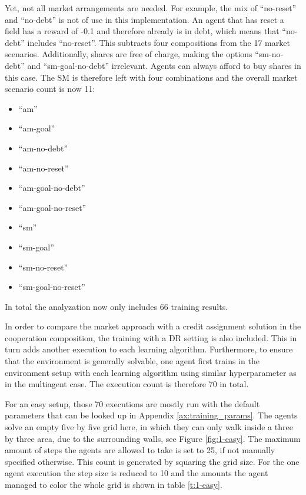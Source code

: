 Yet, not all market arrangements are needed. For example, the mix of ``no-reset'' and ``no-debt'' is not of use in this implementation. An agent that has reset a field has a reward of -0.1 and therefore already is in debt, which means that ``no-debt'' includes ``no-reset''. This subtracts four compositions from the 17 market scenarios. Additionally, shares are free of charge, making the options ``sm-no-debt'' and ``sm-goal-no-debt'' irrelevant. Agents can always afford to buy shares in this case. The SM is therefore left with four combinations and the overall market scenario count is now 11:
\begin{itemize}
    \item ``am''
    \item ``am-goal''
    \item ``am-no-debt''
    \item ``am-no-reset''
    \item ``am-goal-no-debt''
    \item ``am-goal-no-reset''
    \item ``sm''
    \item ``sm-goal''
    \item ``sm-no-reset''
    \item ``sm-goal-no-reset''
\end{itemize}
In total the analyzation now only includes 66 training results. 

In order to compare the market approach with a credit assignment solution in the cooperation composition, the training with a DR setting is also included. This in turn adds another execution to each learning algorithm. Furthermore, to ensure that the environment is generally solvable, one agent first trains in the environment setup with each learning algorithm using similar hyperparameter as in the multiagent case. The execution count is therefore 70 in total.

For an easy setup, those 70 executions are mostly run with the default parameters that can be looked up in Appendix \ref{ax:training_params}. The agents solve an empty five by five grid here, in which they can only walk inside a three by three area, due to the surrounding walls, see Figure \ref{fig:1-easy}. The maximum amount of steps the agents are allowed to take is set to 25, if not manually specified otherwise. This count is generated by squaring the grid size. For the one agent execution the step size is reduced to 10 and the amounts the agent managed to color the whole grid is shown in table \ref{t:1-easy}.

